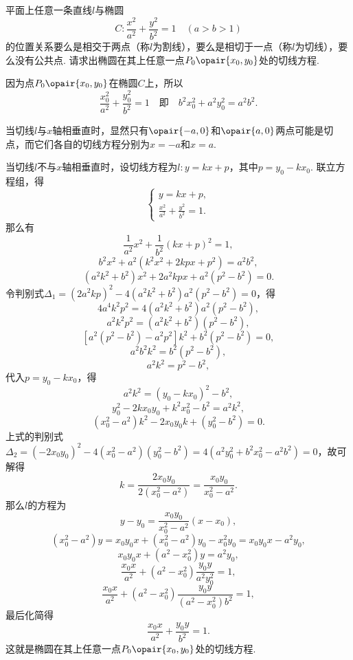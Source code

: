 \begin{example}\label{example:解析几何.椭圆的切线}
平面上任意一条直线\(l\)与椭圆\[
C: \frac{x^2}{a^2} + \frac{y^2}{b^2} = 1 \quad(a>b>1)
\]的位置关系要么是相交于两点（称\(l\)为割线），要么是相切于一点（称\(l\)为切线），要么没有公共点.
请求出椭圆在其上任意一点\(P_0\opair{x_0,y_0}\)处的切线方程.
\begin{solution}
因为点\(P_0\opair{x_0,y_0}\)在椭圆\(C\)上，所以\[
\frac{x_0^2}{a^2} + \frac{y_0^2}{b^2} = 1
\quad\text{即}\quad
b^2 x_0^2 + a^2 y_0^2 = a^2 b^2.
\]

当切线\(l\)与\(x\)轴相垂直时，显然只有\(\opair{-a,0}\)和\(\opair{a,0}\)两点可能是切点，而它们各自的切线方程分别为\(x=-a\)和\(x=a\).

当切线\(l\)不与\(x\)轴相垂直时，设切线方程为\(l: y = kx + p\)，其中\(p = y_0 - k x_0\).
联立方程组，得\[
\begin{cases}
y = kx + p, \\
\frac{x^2}{a^2} + \frac{y^2}{b^2} = 1.
\end{cases}
\]那么有\[
\frac{1}{a^2} x^2 + \frac{1}{b^2} (kx+p)^2 = 1,
\]\[
b^2 x^2 + a^2 (k^2 x^2 + 2kpx + p^2) = a^2 b^2,
\]\[
(a^2 k^2 + b^2) x^2 + 2 a^2 k p x + a^2 (p^2 - b^2) = 0.
\]令判别式\(\Delta_1 = (2 a^2 k p)^2 - 4 (a^2 k^2 + b^2) a^2 (p^2 - b^2) = 0\)，得\[
4 a^4 k^2 p^2 = 4 (a^2 k^2 + b^2) a^2 (p^2 - b^2),
\]\[
a^2 k^2 p^2 = (a^2 k^2 + b^2)(p^2 - b^2),
\]\[
[a^2 (p^2 - b^2) - a^2 p^2] k^2 + b^2 (p^2 - b^2) = 0,
\]\[
a^2 b^2 k^2 = b^2 (p^2 - b^2),
\]\[
a^2 k^2 = p^2 - b^2,
\]
代入\(p = y_0 - k x_0\)，得\[
a^2 k^2 = (y_0 - k x_0)^2 - b^2,
\]\[
y_0^2 - 2k x_0 y_0 + k^2 x_0^2 - b^2 = a^2 k^2,
\]\[
(x_0^2 - a^2) k^2 - 2 x_0 y_0 k + (y_0^2 - b^2) = 0.
\]上式的判别式\(\Delta_2 = (-2 x_0 y_0)^2 - 4(x_0^2 - a^2)(y_0^2 - b^2)
= 4(a^2 y_0^2 + b^2 x_0^2 - a^2 b^2) = 0\)，故可解得\[
k = \frac{2 x_0 y_0}{2 (x_0^2 - a^2)}
= \frac{x_0 y_0}{x_0^2 - a^2}.
\]那么\(l\)的方程为\[
y - y_0 = \frac{x_0 y_0}{x_0^2 - a^2} (x - x_0),
\]\[
(x_0^2 - a^2) y = x_0 y_0 x + (x_0^2 - a^2) y_0 - x_0^2 y_0
= x_0 y_0 x - a^2 y_0,
\]\[
x_0 y_0 x + (a^2 - x_0^2) y = a^2 y_0,
\]\[
\frac{x_0 x}{a^2} + (a^2 - x_0^2) \frac{y_0 y}{a^2 y_0^2} = 1,
\]\[
\frac{x_0 x}{a^2} + (a^2 - x_0^2) \frac{y_0 y}{(a^2 - x_0^2) b^2} = 1,
\]最后化简得\begin{equation}\label{equation:解析几何.椭圆的切线}
\frac{x_0 x}{a^2} + \frac{y_0 y}{b^2} = 1.
\end{equation}
这就是椭圆在其上任意一点\(P_0\opair{x_0,y_0}\)处的切线方程.
\end{solution}
\end{example}


